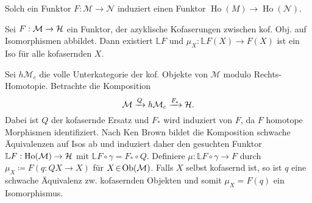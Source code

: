 \documentclass{cheat-sheet}
\newcommand{\ModC}{\mathcal{M}} %
\newcommand{\NodC}{\mathcal{N}} %
\DeclareMathOperator{\Ho}{Ho} %
\newcommand{\LD}[1]{\mathbb{L} #1} %
\newcommand{\RD}[1]{\mathbb{R} #1} %
\newenvironment{centertikzcd}
  {\begin{center}\begin{tikzcd}}
  {\end{tikzcd}\end{center}}
\begin{document}
\begin{bem}
  Solch ein Funktor $F : \ModC \to \NodC$ induziert einen Funktor $\Ho(M) \to \Ho(\NodC)$.
\end{bem}


\begin{satz}
  Sei $F : \ModC \to \HatC$ ein Funktor, der azyklische Kofaserungen zwischen kof. Obj. auf Isomorphismen abbildet.
  Dann existiert $\LD{F}$ und $\mu_X : \LD{F}(X) \to F(X)$ ist ein Iso für alle kofasernden $X$.
\end{satz}

\begin{konstr}
  Sei $h \ModC_c$ die volle Unterkategorie der kof. Objekte von $\ModC$ modulo Rechts-Homotopie.
  Betrachte die Komposition
  \[ \ModC \xrightarrow{Q} h \ModC_c \xrightarrow{F_*} \HatC. \]
  Dabei ist $Q$ der kofasernde Ersatz und $F_*$ wird induziert von $F$, da $F$ homotope Morphismen identifiziert.
  Nach Ken Brown bildet die Komposition schwache Äquivalenzen auf Isos ab und induziert daher den gesuchten Funktor $\LD{F} : \Ho(\ModC) \to \HatC$ mit $\LD{F} \circ \gamma = F_* \circ Q$.
  Definiere $\mu : \LD{F} \circ \gamma \!\to\! F$ durch $\mu_X \!\coloneqq\! F(q : QX \!\to\! X)$ für $X \!\in\! \Ob(\ModC)$.
  Falls $X$ selbst kofasernd ist, so ist $q$ eine schwache Äquivalenz zw. kofasernden Objekten und somit $\mu_X = F(q)$ ein Isomorphismus.
\end{konstr}
\end{document}
